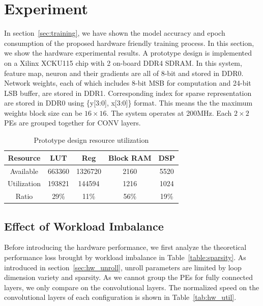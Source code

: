 \section{Experiment}\label{sec:experiment}
In section~\ref{sec:training}, we have shown the model accuracy and epoch consumption of the proposed hardware friendly training process. In this section, we show the hardware experimental results. A prototype design is implemented on a Xilinx XCKU115 chip with 2 on-board DDR4 SDRAM. In this system, feature map, neuron and their gradients are all of 8-bit and stored in DDR0. Network weights, each of which includes 8-bit MSB for computation and 24-bit LSB buffer, are stored in DDR1. Corresponding index for sparse representation are stored in DDR0 using \{y[3:0], x[3:0]\} format. This means the the maximum weights block size can be $16\times 16$. The system operates at 200MHz. Each $2\times 2$ PEs are grouped together for CONV layers.

\begin{table}[tb]
  \centering
  \caption{Prototype design resource utilization}
    \begin{tabular}{|c|c|c|c|c|}
    \hline
    Resource & LUT   & Reg   & Block RAM & DSP \\
    \hline
    Available & 663360 & 1326720 & 2160  & 5520 \\
    \hline
    Utilization & 193821 & 144594 & 1216   & 1024 \\
    \hline
    Ratio & 29\%  & 11\%  & 56\%  & 19\% \\
    \hline
    \end{tabular}
  \label{tab:util}
\end{table}

\subsection{Effect of Workload Imbalance}\label{sec:exp:imb}

Before introducing the hardware performance, we first analyze the theoretical performance loss brought by workload imbalance in Table~\ref{table:sparsity}. As introduced in section~\ref{sec:hw_unroll}, unroll parameters are limited by loop dimension variety and sparsity. As we cannot group the PEs for fully connected layers, we only compare on the convolutional layers. The normalized speed on the convolutional layers of each configuration is shown in Table~\ref{tab:hw_util}.

